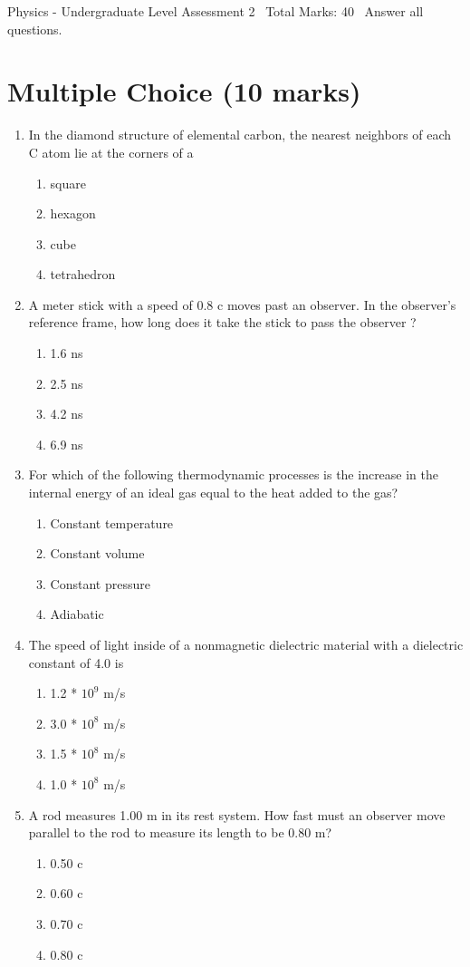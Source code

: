 \documentclass[12pt]{article}
\begin{document}
\begin{center}
Physics - Undergraduate Level Assessment 2 \
Total Marks: 40 \
Answer all questions.
\end{center}

\section*{Multiple Choice (10 marks)}
\begin{enumerate}[label=\arabic*.]
\item In the diamond structure of elemental carbon, the nearest neighbors of each C atom lie at the corners of a
\begin{enumerate}[label=(\alph*)]
    \item square
    \item hexagon
    \item cube
    \item tetrahedron
\end{enumerate}
\item A meter stick with a speed of 0.8 c moves past an observer. In the observer's reference frame, how long does it take the stick to pass the observer ?
\begin{enumerate}[label=(\alph*)]
    \item 1.6 ns
    \item 2.5 ns
    \item 4.2 ns
    \item 6.9 ns
\end{enumerate}
\item For which of the following thermodynamic processes is the increase in the internal energy of an ideal gas equal to the heat added to the gas?
\begin{enumerate}[label=(\alph*)]
    \item Constant temperature
    \item Constant volume
    \item Constant pressure
    \item Adiabatic
\end{enumerate}
\item The speed of light inside of a nonmagnetic dielectric material with a dielectric constant of 4.0 is
\begin{enumerate}[label=(\alph*)]
    \item 1.2 * $10^9$ m/s
    \item 3.0 * $10^8$ m/s
    \item 1.5 * $10^8$ m/s
    \item 1.0 * $10^8$ m/s
\end{enumerate}
\item A rod measures 1.00 m in its rest system. How fast must an observer move parallel to the rod to measure its length to be 0.80 m?
\begin{enumerate}[label=(\alph*)]
    \item 0.50 c
    \item 0.60 c
    \item 0.70 c
    \item 0.80 c
\end{enumerate}
\end{enumerate}
\end{document}
